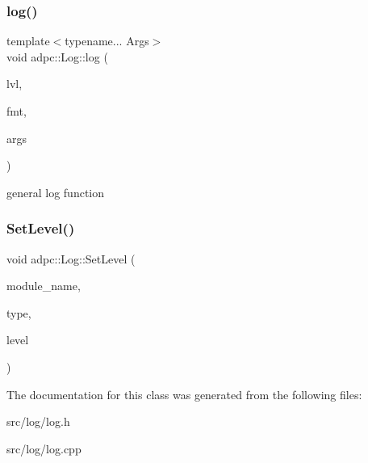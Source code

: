 \subsubsection{\texorpdfstring{log()}{log()}}
{\footnotesize\ttfamily template$<$typename... Args$>$ \\
void adpc\+::\+Log\+::log (\begin{DoxyParamCaption}\item[{\hyperlink{log__config_8h_a172986fa5f658c5fe0b42bd954e9e133}{Log\+Level}}]{lvl,  }\item[{const char $\ast$}]{fmt,  }\item[{const Args \&...}]{args }\end{DoxyParamCaption})\hspace{0.3cm}{\ttfamily [inline]}}

general log function \mbox{\label{classadpc_1_1Log_a2e8bf1e2c8ac8381be9022df60530f87}} 
\subsubsection{\texorpdfstring{Set\+Level()}{SetLevel()}}
{\footnotesize\ttfamily void adpc\+::\+Log\+::\+Set\+Level (\begin{DoxyParamCaption}\item[{const string \&}]{module\+\_\+name,  }\item[{const Log\+Sink\+Type}]{type,  }\item[{const \hyperlink{log__config_8h_a172986fa5f658c5fe0b42bd954e9e133}{Log\+Level}}]{level }\end{DoxyParamCaption})\hspace{0.3cm}{\ttfamily [inline]}}



The documentation for this class was generated from the following files\+:\begin{DoxyCompactItemize}
\item 
src/log/log.\+h\item 
src/log/log.\+cpp\end{DoxyCompactItemize}

